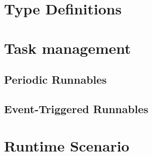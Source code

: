 \section{Type Definitions}








\section{Task management}

\subsection{Periodic Runnables}
\label{sec:periodic_runnables}

\subsection{Event-Triggered Runnables}

\clearpage

\section{Runtime Scenario}

\clearpage 